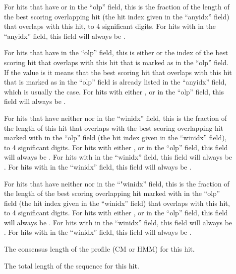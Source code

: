 \begin{description}
\item[]
For hits that have \ccode{=} or \ccode{\$} in the ``olp'' field, this is the
fraction of the length of the best scoring overlapping hit (the hit
index given in the ``anyidx'' field) that overlaps with this hit,
to 4 significant digits. 
For hits with \ccode{-} in the ``anyidx''
field, this field will always be \ccode{-}.  

\item[] 
For hits that have \ccode{=} in the ``olp'' field, this is either
 or the index of the best scoring hit that overlaps with this
hit that is marked as \ccode{\^} in the ``olp'' field. If the value
is  it means that the best scoring hit that overlaps with
this hit that is marked as \ccode{\^} in the ``olp'' field is
already listed in the ``anyidx'' field, which is usually the case.
For hits with either \ccode{*}, \ccode{\^} or \ccode{\$} in the ``olp'' field,
this field will always be \ccode{-}.

\item[]
For hits that have neither \ccode{-} nor  in the
``winidx'' field, this is the fraction of the length of this hit
that overlaps with the best scoring overlapping hit marked with
\ccode{\^} in the ``olp'' field (the hit index given in the
``winidx'' field), to 4 significant digits.  For hits with either
\ccode{*}, \ccode{\^} or \ccode{\$} in the ``olp'' field, this field will
always be \ccode{-}.  For hits with \ccode{-} in the ``winidx''
field, this field will always be \ccode{-}.  
For hits with  in the ``winidx''
field, this field will always be .  

\item[]
For hits that have neither \ccode{-} nor  in the
``"winidx'' field, this is the
fraction of the length of the best scoring overlapping hit marked with
\ccode{\^} in the ``olp'' field (the hit
index given in the ``winidx'' field) that overlaps with this hit,
to 4 significant digits. 
For hits with either 
\ccode{*}, \ccode{\^} or \ccode{\$} in the ``olp'' field, this field will
always be \ccode{-}.  For hits with \ccode{-} in the ``winidx''
field, this field will always be \ccode{-}.  
For hits with  in the ``winidx''
field, this field will always be .  

\item[]
The consensus length of the profile (CM or HMM) for this hit.

\item[]
The total length of the sequence for this hit.

\end{description}


